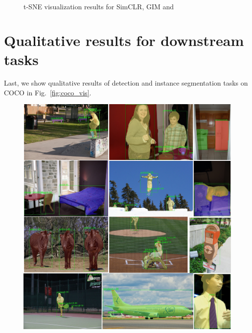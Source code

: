 \begin{figure}[htbp]
\begin{minipage}[t]{0.31\linewidth}
    \end{minipage}
    \caption{t-SNE visualization results for SimCLR, GIM and \ours{}}
    \label{fig:tsne_vis}
    \end{figure}
\fi

\clearpage

\section{Qualitative results for downstream tasks}

Last, we show qualitative results of detection and instance segmentation tasks on COCO in Fig.~\ref{fig:coco_vis}.

\begin{figure}[htbp]
\centering
\iflatexml
\includegraphics[width=6\linewidth]{figures/coco_vis.pdf}
\else

\end{figure}
